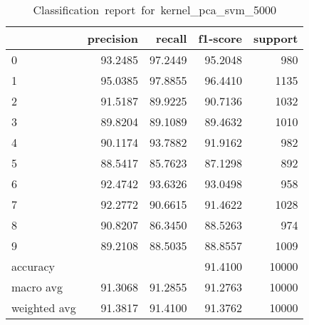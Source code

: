 \begin{table}[htb!]
    \centering
    \begin{tabular}{lrrrr}
        \toprule
                     & precision & recall  & f1-score & support \\
        \midrule
        0            & 93.2485   & 97.2449 & 95.2048  & 980     \\
        1            & 95.0385   & 97.8855 & 96.4410  & 1135    \\
        2            & 91.5187   & 89.9225 & 90.7136  & 1032    \\
        3            & 89.8204   & 89.1089 & 89.4632  & 1010    \\
        4            & 90.1174   & 93.7882 & 91.9162  & 982     \\
        5            & 88.5417   & 85.7623 & 87.1298  & 892     \\
        6            & 92.4742   & 93.6326 & 93.0498  & 958     \\
        7            & 92.2772   & 90.6615 & 91.4622  & 1028    \\
        8            & 90.8207   & 86.3450 & 88.5263  & 974     \\
        9            & 89.2108   & 88.5035 & 88.8557  & 1009    \\
        accuracy     &           &         & 91.4100  & 10000   \\
        macro avg    & 91.3068   & 91.2855 & 91.2763  & 10000   \\
        weighted avg & 91.3817   & 91.4100 & 91.3762  & 10000   \\
        \bottomrule
    \end{tabular}
    \caption{Classification\ report\ for\ kernel\_pca\_svm\_5000}
    \label{tab:classification-report-kernel_pca_svm_5000}
\end{table}
